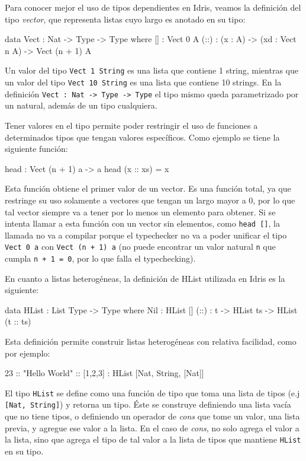 Para conocer mejor el uso de tipos dependientes en Idris, veamos la definición del tipo \textit{vector}, que representa listas cuyo largo es anotado en su tipo:

\begin{code}
data Vect : Nat -> Type -> Type where
  [] : Vect 0 A
  (::) : (x : A) -> (xd : Vect n A) -> Vect (n + 1) A
\end{code}

Un valor del tipo \texttt{Vect 1 String} es una lista que contiene 1 string, mientras que un valor del tipo \texttt{Vect 10 String} es una lista que contiene 10 strings. En la definición \texttt{Vect : Nat -> Type -> Type} el tipo mismo queda parametrizado por un natural, además de un tipo cualquiera.

Tener valores en el tipo permite poder restringir el uso de funciones a determinados tipos que tengan valores específicos. Como ejemplo se tiene la siguiente función:

\begin{code}
head : Vect (n + 1) a -> a
head (x :: xs) = x
\end{code}

Esta función obtiene el primer valor de un vector. Es una función total, ya que restringe su uso solamente a vectores que tengan un largo mayor a 0, por lo que tal vector siempre va a tener por lo menos un elemento para obtener. Si se intenta llamar a esta función con un vector sin elementos, como \texttt{head []}, la llamada no va a compilar porque el typechecker no va a poder unificar el tipo \texttt{Vect 0 a} con \texttt{Vect (n + 1) a} (no puede encontrar un valor natural \texttt{n} que cumpla \texttt{n + 1 = 0}, por lo que falla el typechecking).

En cuanto a listas heterogéneas, la definición de HList utilizada en Idris es la siguiente:

\begin{code}
data HList : List Type -> Type where
  Nil : HList []
  (::) : t -> HList ts -> HList (t :: ts)
\end{code}

Esta definición permite construir listas heterogéneas con relativa facilidad, como por ejemplo:

\begin{code}
23 :: "Hello World" :: [1,2,3] :
  HList [Nat, String, [Nat]]
\end{code}

El tipo \texttt{HList} se define como una función de tipo que toma una lista de tipos (e.j \texttt{[Nat, String]}) y retorna un tipo. Éste se construye definiendo una lista vacía que no tiene tipos, o definiendo un operador de \textit{cons} que tome un valor, una lista previa, y agregue ese valor a la lista. En el caso de \textit{cons}, no solo agrega el valor a la lista, sino que agrega el tipo de tal valor a la lista de tipos que mantiene \texttt{HList} en su tipo.

